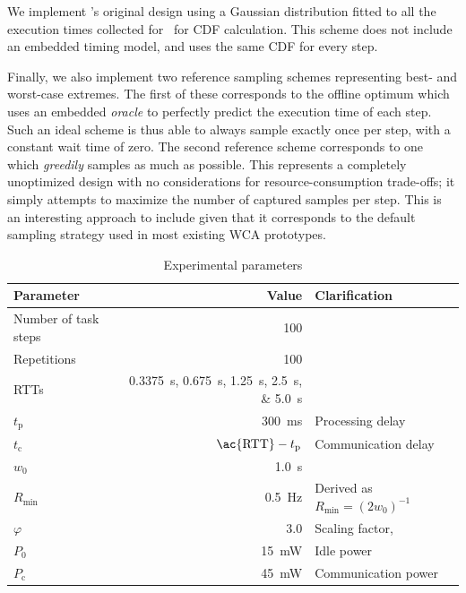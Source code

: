 We implement \citeauthor{Wang2019Towards}'s original design using a Gaussian distribution fitted to all the execution times collected for~\cite{olguinmunoz:impact2021} for \ac{CDF} calculation.
This scheme does not include an embedded timing model, and uses the same \ac{CDF} for every step.

Finally, we also implement two reference sampling schemes representing best- and worst-case extremes.
The first of these corresponds to the offline optimum which uses an embedded \emph{oracle} to perfectly predict the execution time of each step.
Such an ideal scheme is thus able to always sample exactly once per step, with a constant wait time of zero.
The second reference scheme corresponds to one which \emph{greedily} samples as much as possible.
This represents a completely unoptimized design with no considerations for resource-consumption trade-offs; it simply attempts to maximize the number of captured samples per step.
This is an interesting approach to include given that it corresponds to the default sampling strategy used in most existing \ac{WCA} prototypes.

\begin{table}
    \centering
    \caption{Experimental parameters}\label{tab:params}
    \begin{tabular}{lrl}
        \toprule
        Parameter & Value & Clarification \\
        \midrule
        Number of task steps & \num{100} & \\
        Repetitions & \num{100} & \\
        \acp{RTT} & \SIlist{0.3375;0.675;1.25;2.5;5.0}{\second} & \\
        \( t_\text{p} \) & \SI{300}{\milli\second} & Processing delay \\
        \( t_\text{c} \) & \( \text{\ac{RTT}} - t_\text{p} \) & Communication delay \\
        \( w_0 \) & \SI{1.0}{\second} & \\
        \( R_\text{min} \) & \SI{0.5}{\hertz} & Derived as \( R_\text{min} = {(2 w_0)}^{-1} \) \\
        \( \varphi \) & 3.0 & Scaling factor, \textcite{Wang2019Towards}\\
        \( P_0 \) & \SI{15}{\milli\watt} & Idle power \\
        \( P_\text{c} \) & \SI{45}{\milli\watt} & Communication power \\
        \bottomrule
    \end{tabular}
\end{table}


